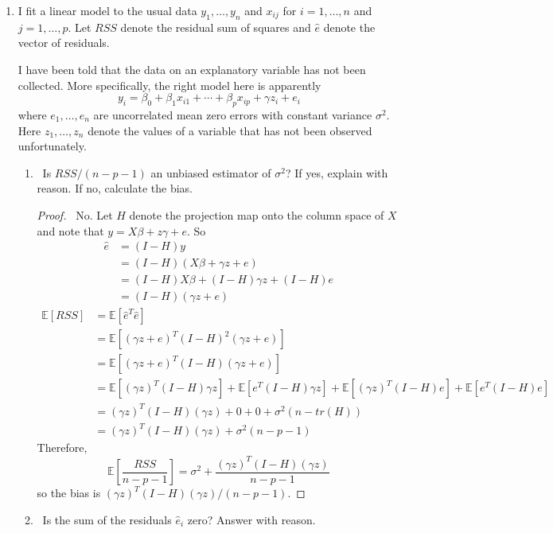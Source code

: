 \documentclass[12pt]{article}
\newcommand{\E}{\mathbb{E}}
\begin{document}
\begin{enumerate}[leftmargin=0cm,itemindent=.5cm,labelwidth=\itemindent,labelsep=0cm,align=left]
\item I fit a linear model to the usual data $y_1, \dots , y_n$ and $x_{ij}$ for $i = 1, \dots , n$ and $j = 1, \dots , p$.  Let $RSS$ denote the residual sum of squares and $\hat{e}$ denote the vector of residuals.

I have been told that the data on an explanatory variable has not been collected.  More specifically, the right model here is apparently
$$
y_i = \beta_0 + \beta_1 x_{i1} + \cdots + \beta_p x_{ip} + \gamma z_i + e_i
$$
where $e_1, \dots , e_n$ are uncorrelated mean zero errors with constant variance $\sigma^2$.  Here $z_1, \dots, z_n$ denote the values of a variable that has not been observed unfortunately.

\begin{enumerate}
\item \ Is $RSS / (n-p-1)$ an unbiased estimator of $\sigma^2$?  If yes, explain with reason.  If no, calculate the bias.

\begin{proof}
\ No.  Let $H$ denote the projection map onto the column space of $X$ and note that $y = X\beta + z \gamma + e$.  So
\begin{align*}
\hat{e} &= (I-H)y
\\
&= (I-H)(X\beta + \gamma z + e)
\\
&= (I-H)X\beta + (I-H)\gamma z + (I-H)e
\\
&= (I-H)(\gamma z + e)
\end{align*}
\begin{align*}
\E[RSS] &=  \E[\hat{e}^T\hat{e}]
\\
&= \E[(\gamma z + e)^T (I-H)^2 (\gamma z + e)]
\\
&= \E[(\gamma z + e)^T (I-H) (\gamma z + e)]
\\
&= \E[(\gamma z)^T (I-H) \gamma z]
+ \E[e^T (I-H) \gamma z] + \E[(\gamma z)^T (I-H) e] + \E[e^T (I-H)e]
\\
&= (\gamma z)^T (I-H) (\gamma z) + 0 + 0 + \sigma^2 (n - tr(H))
\\
&= (\gamma z)^T (I-H) (\gamma z) + \sigma^2(n-p-1)
\end{align*}
Therefore,
$$
\E \left[ \frac{RSS}{n-p-1} \right] = \sigma^2 + \frac{(\gamma z)^T (I-H) (\gamma z)}{n-p-1}
$$
so the bias is $(\gamma z)^T (I-H) (\gamma z) / (n-p-1)$.
\end{proof}

\item \ Is the sum of the residuals $\hat{e}_i$ zero?  Answer with reason.


\end{enumerate}
\end{enumerate}
\end{document}
